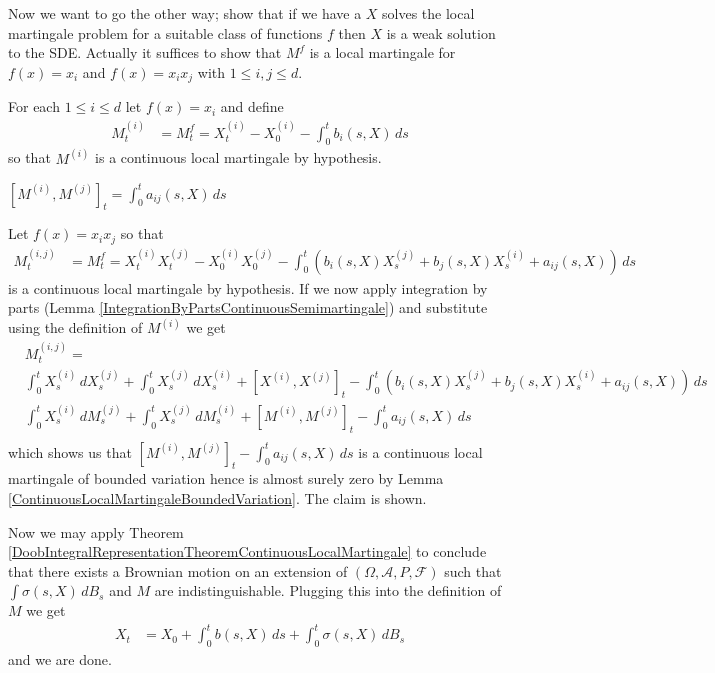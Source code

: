 Now we want to go the other way; show that if we have a $X$ solves the local martingale problem for a suitable class of functions $f$ then $X$ is a weak solution to the SDE.  Actually it suffices to show that $M^f$ is a local martingale for $f(x) = x_i$ and $f(x) = x_ix_j$ with $1 \leq i,j \leq d$.

For each $1 \leq i \leq d$ let $f(x) = x_i$ and define 
\begin{align*}
M^{(i)}_t &= M^f_t = X^{(i)}_t - X^{(i)}_0 - \int_0^t b_i(s,X) \, ds
\end{align*}
so that $M^{(i)}$ is a continuous local martingale by hypothesis.

\begin{clm}$[M^{(i)}, M^{(j)}]_t = \int_0^t a_{ij}(s,X) \, ds$
\end{clm}

Let $f(x) = x_ix_j$ so that
\begin{align*}
M^{(i,j)}_t &= M^f_t = X^{(i)}_t X^{(j)}_t - X^{(i)}_0 X^{(j)}_0 - \int_0^t \left( b_i(s,X) X^{(j)}_s + b_j(s,X) X^{(i)}_s + a_{ij}(s,X) \right ) \, ds 
\end{align*}
is a continuous local martingale by hypothesis.  If we now apply integration by parts (Lemma \ref{IntegrationByPartsContinuousSemimartingale}) and substitute using the definition of $M^{(i)}$ we get
\begin{align*}
&M^{(i,j)}_t = \\
&\int_0^t X^{(i)}_s \,  dX^{(j)}_s + \int_0^t X^{(j)}_s \,  dX^{(i)}_s + [X^{(i)}, X^{(j)}]_t- \int_0^t \left( b_i(s,X) X^{(j)}_s + b_j(s,X) X^{(i)}_s + a_{ij}(s,X) \right ) \, ds \\
&\int_0^t X^{(i)}_s \,  dM^{(j)}_s + \int_0^t X^{(j)}_s \,  dM^{(i)}_s + [M^{(i)}, M^{(j)}]_t- \int_0^t a_{ij}(s,X) \, ds \\
\end{align*}
which shows us that $[M^{(i)}, M^{(j)}]_t - \int_0^t a_{ij}(s,X) \, ds$ is a continuous local martingale of bounded variation hence is almost surely zero by Lemma \ref{ContinuousLocalMartingaleBoundedVariation}.  The claim is shown.

Now we may apply Theorem \ref{DoobIntegralRepresentationTheoremContinuousLocalMartingale} to conclude that there exists a Brownian motion on an extension of $(\Omega, \mathcal{A}, P, \mathcal{F})$ such that $\int \sigma(s,X) \, dB_s$ and $M$ are indistinguishable.  Plugging this into the definition of $M$ we get
\begin{align*}
X_t &= X_0 + \int_0^t b(s,X) \, ds + \int_0^t \sigma(s,X) \, dB_s
\end{align*}
and we are done.

